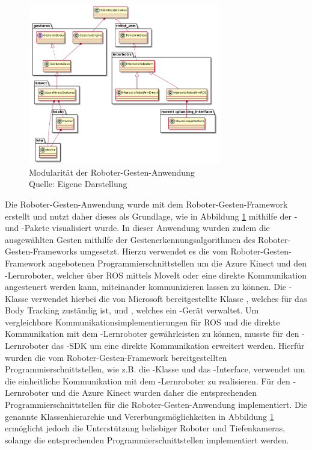 \begin{figure}[htb]
	\centering
	\includegraphics[width=0.75\textwidth]{images/loesungsweg/gesture_robot_system_uml}
	\caption[Modularität der Roboter-Gesten-Anwendung]{Modularität der Roboter-Gesten-Anwendung\\Quelle: Eigene Darstellung}
	\label{fig:gesture_robot_system_uml}
\end{figure}
\FloatBarrier

Die Roboter-Gesten-Anwendung wurde mit dem Roboter-Gesten-Framework erstellt und nutzt daher dieses als Grundlage, wie in Abbildung \ref{fig:gesture_robot_system_uml} mithilfe der - und -Pakete visualisiert wurde. In dieser Anwendung wurden zudem die ausgewählten Gesten mithilfe der Gestenerkennungsalgorithmen des Roboter-Gesten-Frameworks umgesetzt. Hierzu verwendet es die vom Roboter-Gesten-Framework angebotenen Programmierschnittstellen um die Azure Kinect und den -Lernroboter, welcher über ROS mittels MoveIt oder eine direkte Kommunikation angesteuert werden kann, miteinander kommunizieren lassen zu können. Die -Klasse verwendet hierbei die von Microsoft bereitgestellte Klasse , welches für das Body Tracking zuständig ist, und , welches ein -Gerät verwaltet. Um vergleichbare Kommunikationsimplementierungen für ROS und die direkte Kommunikation mit dem -Lernroboter gewährleisten zu können, musste für den -Lernroboter das -SDK um eine direkte Kommunikation erweitert werden. Hierfür wurden die vom Roboter-Gesten-Framework bereitgestellten Programmierschnittstellen, wie z.B. die -Klasse und das -Interface, verwendet um die einheitliche Kommunikation mit dem -Lernroboter zu realisieren. Für den -Lernroboter und die Azure Kinect wurden daher die entsprechenden Programmierschnittstellen für die Roboter-Gesten-Anwendung implementiert. Die genannte Klassenhierarchie und Vererbungsmöglichkeiten in Abbildung \ref{fig:gesture_robot_system_uml} ermöglicht jedoch die Unterstützung beliebiger Roboter und Tiefenkameras, solange die entsprechenden Programmierschnittstellen implementiert werden.\\

